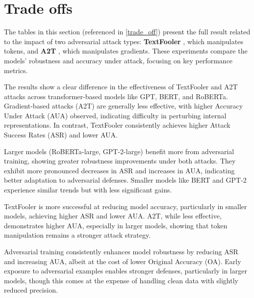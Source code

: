 \documentclass{article}
\begin{document}
\section{Trade offs}\label{app: trade}

The tables in this section (referenced in \ref{trade_off}) present the full result related to the impact of two adversarial attack types: \textbf{TextFooler} \cite{jin2020bert}, which manipulates tokens, and \textbf{A2T} \cite{yoo2021towards}, which manipulates gradients. These experiments compare the models' robustness and accuracy under attack, focusing on key performance metrics.



The results show a clear difference in the effectiveness of TextFooler and A2T attacks across transformer-based models like GPT, BERT, and RoBERTa. Gradient-based attacks (A2T) are generally less effective, with higher Accuracy Under Attack (AUA) observed, indicating difficulty in perturbing internal representations. In contrast, TextFooler consistently achieves higher Attack Success Rates (ASR) and lower AUA.

Larger models (RoBERTa-large, GPT-2-large) benefit more from adversarial training, showing greater robustness improvements under both attacks. They exhibit more pronounced decreases in ASR and increases in AUA, indicating better adaptation to adversarial defenses. Smaller models like BERT and GPT-2 experience similar trends but with less significant gains.

TextFooler is more successful at reducing model accuracy, particularly in smaller models, achieving higher ASR and lower AUA. A2T, while less effective, demonstrates higher AUA, especially in larger models, showing that token manipulation remains a stronger attack strategy.

Adversarial training consistently enhances model robustness by reducing ASR and increasing AUA, albeit at the cost of lower Original Accuracy (OA). Early exposure to adversarial examples enables stronger defenses, particularly in larger models, though this comes at the expense of handling clean data with slightly reduced precision.
\end{document}
